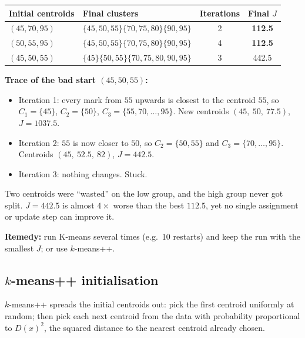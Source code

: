 \documentclass[11pt,a4paper]{article}
\begin{document}
\begin{example}
\begin{center}
\begin{tabular}{@{}llcc@{}}
\toprule
Initial centroids & Final clusters & Iterations & Final $J$\\
\midrule
$(45,70,95)$ & $\{45,50,55\}\{70,75,80\}\{90,95\}$ & 2 & \textbf{112.5}\\
$(50,55,95)$ & $\{45,50,55\}\{70,75,80\}\{90,95\}$ & 4 & \textbf{112.5}\\
$(45,50,55)$ & $\{45\}\{50,55\}\{70,75,80,90,95\}$ & 3 & 442.5\\
\bottomrule
\end{tabular}
\end{center}
\textbf{Trace of the bad start $(45,50,55)$:}
\begin{itemize}[nosep]
\item Iteration 1: every mark from $55$ upwards is closest to the centroid $55$, so $C_1=\{45\}$, $C_2=\{50\}$, $C_3=\{55,70,\dots,95\}$. New centroids $(45,\ 50,\ 77.5)$, $J=1037.5$.
\item Iteration 2: $55$ is now closer to $50$, so $C_2=\{50,55\}$ and $C_3=\{70,\dots,95\}$. Centroids $(45,\ 52.5,\ 82)$, $J=442.5$.
\item Iteration 3: nothing changes. Stuck.
\end{itemize}
Two centroids were ``wasted'' on the low group, and the high group never got split. $J=442.5$ is almost $4\times$ worse than the best $112.5$, yet no single assignment or update step can improve it.

\textbf{Remedy:} run K-means several times (e.g.\ 10 restarts) and keep the run with the smallest $J$; or use $k$-means++.
\end{example}

\subsection{\texorpdfstring{$k$}{k}-means++ initialisation}\label{sec:kpp}

$k$-means++ spreads the initial centroids out: pick the first centroid uniformly at random; then pick each next centroid from the data with probability proportional to $D(x)^2$, the squared distance to the nearest centroid already chosen.
\end{document}
